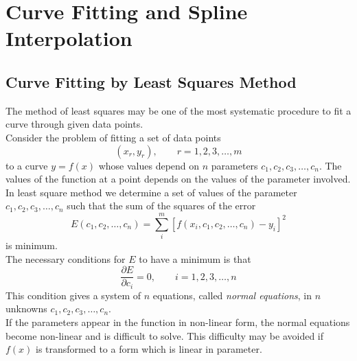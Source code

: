 \documentclass[12pt,class=book,crop=false]{standalone}
\begin{document}
\chapter{Curve Fitting and Spline Interpolation}
\section{Curve Fitting by Least Squares Method}
The method of least squares may be one of the most systematic procedure to fit a curve through given data points.\\
Consider the problem of fitting a set of data points
\[
	(x_r,y_r),\qquad r=1,2,3,\dots,m
\]
to a curve $ y=f(x) $ whose values depend on $ n $ parameters $ c_1,c_2,c_3,\dots,c_n $. The values of the function at a point depends on the values of the parameter involved. In least square method we determine a set of values of the parameter $ c_1,c_2,c_3,\dots,c_n $ such that the sum of the squares of the error
\[
	E(c_1,c_2,\dots,c_n)=\sum_i^m\left[f\left(x_i,c_1,c_2,\dots,c_n\right)-y_i \right]^2
\]
is minimum.\\
The necessary conditions for $ E $ to have a minimum is that
\[
	\frac{\partial E}{\partial c_i}=0,\qquad i=1,2,3,\dots,n
\]
This condition gives a system of $ n $ equations, called \emph{normal equations}, in $ n $ unknowns $ c_1,c_2,c_3,\dots,c_n $.\\
If the parameters appear in the function in non-linear form, the normal equations become non-linear and is difficult to solve. This difficulty may be avoided if $ f(x) $ is transformed to a form which is linear in parameter.
\end{document}
